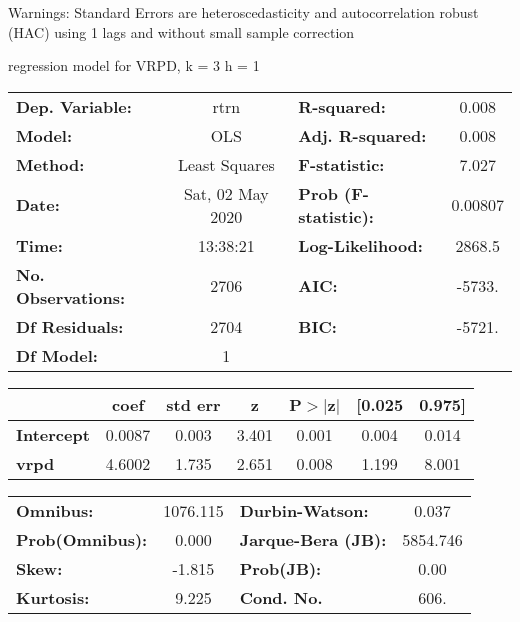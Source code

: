 Warnings: \newline
 [1] Standard Errors are heteroscedasticity and autocorrelation robust (HAC) using 1 lags and without small sample correction\ 

regression model for VRPD, k = 3 h = 1\begin{center}
\begin{tabular}{lclc}
\toprule
\textbf{Dep. Variable:}    &       rtrn       & \textbf{  R-squared:         } &     0.008   \\
\textbf{Model:}            &       OLS        & \textbf{  Adj. R-squared:    } &     0.008   \\
\textbf{Method:}           &  Least Squares   & \textbf{  F-statistic:       } &     7.027   \\
\textbf{Date:}             & Sat, 02 May 2020 & \textbf{  Prob (F-statistic):} &  0.00807    \\
\textbf{Time:}             &     13:38:21     & \textbf{  Log-Likelihood:    } &    2868.5   \\
\textbf{No. Observations:} &        2706      & \textbf{  AIC:               } &    -5733.   \\
\textbf{Df Residuals:}     &        2704      & \textbf{  BIC:               } &    -5721.   \\
\textbf{Df Model:}         &           1      & \textbf{                     } &             \\
\bottomrule
\end{tabular}
\begin{tabular}{lcccccc}
                   & \textbf{coef} & \textbf{std err} & \textbf{z} & \textbf{P$> |$z$|$} & \textbf{[0.025} & \textbf{0.975]}  \\
\midrule
\textbf{Intercept} &       0.0087  &        0.003     &     3.401  &         0.001        &        0.004    &        0.014     \\
\textbf{vrpd}      &       4.6002  &        1.735     &     2.651  &         0.008        &        1.199    &        8.001     \\
\bottomrule
\end{tabular}
\begin{tabular}{lclc}
\textbf{Omnibus:}       & 1076.115 & \textbf{  Durbin-Watson:     } &    0.037  \\
\textbf{Prob(Omnibus):} &   0.000  & \textbf{  Jarque-Bera (JB):  } & 5854.746  \\
\textbf{Skew:}          &  -1.815  & \textbf{  Prob(JB):          } &     0.00  \\
\textbf{Kurtosis:}      &   9.225  & \textbf{  Cond. No.          } &     606.  \\
\bottomrule
\end{tabular}
\end{center}

